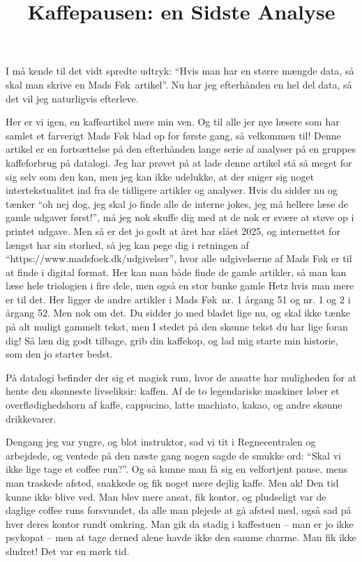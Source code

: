 \documentclass{article}
\title{Kaffepausen: en Sidste Analyse}
\author{}
\date{}
\newcommand{\madsfoek}[0]{Mads Føk\xspace}
\begin{document}
\maketitle

I må kende til det vidt spredte udtryk: ``Hvis man har en større mængde data, så skal man skrive en \madsfoek\ artikel''. Nu har jeg efterhånden en hel del data, så det vil jeg naturligvis efterleve.

Her er vi igen, en kaffeartikel mere min ven. Og til alle jer nye læsere som har samlet et farverigt \madsfoek blad op for første gang, så velkommen til!
Denne artikel er en fortsættelse på den efterhånden lange serie af analyser på en gruppes kaffeforbrug på datalogi.
Jeg har prøvet på at lade denne artikel stå så meget for sig selv som den kan, men jeg kan ikke udelukke, at der sniger sig noget intertekstualitet ind fra de tidligere artikler og analyser. Hvis du sidder nu og tænker ``oh nej dog, jeg skal jo finde alle de interne jokes, jeg må hellere læse de gamle udgaver først!'', må jeg nok skuffe dig med at de nok er svære at støve op i printet udgave. Men så er det jo godt at året har slået 2025, og internettet for længst har sin storhed, så jeg kan pege dig i retningen af ``https://www.madsfoek.dk/udgivelser'', hvor alle udgivelserne af \madsfoek er til at finde i digital format. Her kan man både finde de gamle artikler, så man kan læse hele triologien i fire dele, men også en stor bunke gamle Hetz hvis man mere er til det. Her ligger de andre artikler i \madsfoek\ nr. 1 årgang 51 og nr. 1 og 2 i årgang 52.
Men nok om det. Du sidder jo med bladet lige nu, og skal ikke tænke på alt muligt gammelt tekst, men I stedet på den skønne tekst du har lige foran dig! Så læn dig godt tilbage, grib din kaffekop, og lad mig starte min historie, som den jo starter bedst.

På datalogi befinder der sig et magisk rum, hvor de ansatte har muligheden for at hente den skønneste livseliksir: kaffen. Af de to legendariske maskiner løber et overflødighedshorn af kaffe, cappucino, latte machiato, kakao, og andre skønne drikkevarer.

Dengang jeg var yngre, og blot instruktor, sad vi tit i Regnecentralen og arbejdede, og ventede på den næste gang nogen sagde de smukke ord: ``Skal vi ikke lige tage et coffee run?''. Og så kunne man få sig en velfortjent pause, mens man traskede afsted, snakkede og fik noget mere dejlig kaffe. Men ak! Den tid kunne ikke blive ved. Man blev mere ansat, fik kontor, og pludseligt var de daglige coffee runs forsvundet, da alle man plejede at gå afsted med, også sad på hver deres kontor rundt omkring. Man gik da stadig i kaffestuen -- man er jo ikke psykopat -- men at tage derned alene havde ikke den samme charme. Man fik ikke sludret! Det var en mørk tid.
\end{document}
